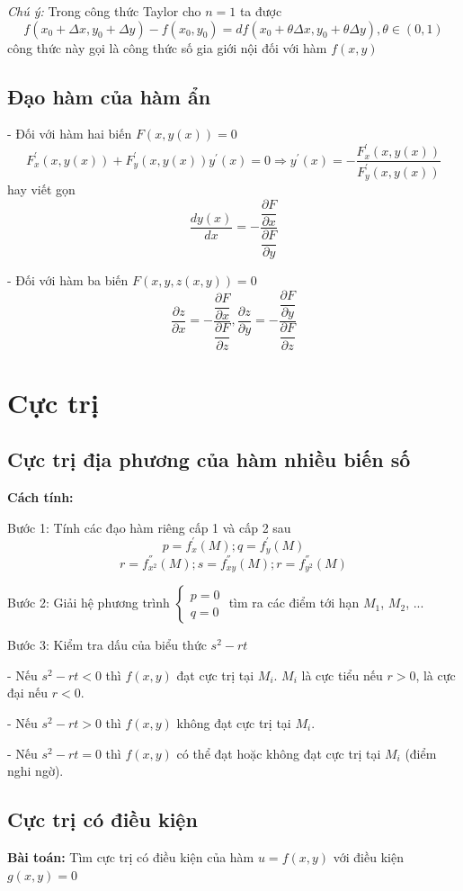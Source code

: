 \documentclass[12pt, a4paper]{article}
\begin{document}
	\textit {Chú ý:} Trong công thức Taylor cho $ n=1 $ ta được
	\[ f(x_0 + \Delta x,y_0 + \Delta y) - f(x_0,y_0) = df(x_0 + \theta \Delta x ,y_0 + \theta \Delta y), \theta \in (0,1)  \] công thức này gọi là công thức số gia giới nội đối với hàm $ f(x,y) $
	
	\subsection{Đạo hàm của hàm ẩn}
	- Đối với hàm hai biến $ F(x,y(x)) = 0 $
	\[ F^{'}_x(x, y(x))  + F^{'}_y(x, y(x))y^{'}(x) =0 \Rightarrow y^{'}(x)=-\dfrac{F^{'}_x(x, y(x))}{F^{'}_y(x, y(x))}  \] hay viết gọn \[ \dfrac{dy(x)}{dx} = -\dfrac{\dfrac {\partial F}{\partial x}}{\dfrac {\partial F}{\partial y}} \]
	
	- Đối với hàm ba biến $ F(x,y,z(x,y)) = 0 $
	\[ \dfrac {\partial z}{\partial x} = -\dfrac{\dfrac {\partial F}{\partial x}}{\dfrac {\partial F}{\partial z}}, \dfrac {\partial z}{\partial y} = -\dfrac{\dfrac {\partial F}{\partial y}}{\dfrac {\partial F}{\partial z}} \]
	
	\section{Cực trị}
	\subsection{Cực trị địa phương của hàm nhiều biến số}
	
	\textbf {Cách tính:}
	
	Bước 1: Tính các đạo hàm riêng cấp 1 và cấp 2 sau
	\[ p=f^{'}_x(M) ; q=f^{'}_y(M) \]
	\[ r=f^{''}_{x^2}(M) ; s=f^{''}_{xy}(M); r=f^{''}_{y^2}(M) \]
	
	Bước 2: Giải hệ phương trình $ \begin{cases} p=0 \\ q=0 \end{cases} $ tìm ra các điểm tới hạn $ M_1 $, $M_2$, ...
	
	Bước 3: Kiểm tra dấu của biểu thức $ s^2-rt $
	
	- Nếu $ s^2-rt <0$ thì $ f(x,y) $ đạt cực trị tại $ M_i $. $ M_i $ là cực tiểu nếu $ r>0 $, là cực đại nếu $ r<0 $.
	
	- Nếu $ s^2-rt >0$ thì $ f(x,y) $ không đạt cực trị tại $ M_i $.
	
	- Nếu $ s^2-rt =0$ thì $ f(x,y) $ có thể đạt hoặc không đạt cực trị tại $ M_i $ (điểm nghi ngờ).
	
	\subsection{Cực trị có điều kiện}
	\textbf {Bài toán:} Tìm cực trị có điều kiện của hàm $ u=f(x,y) $ với điều kiện $ g(x,y)=0 $
	
\end{document}
